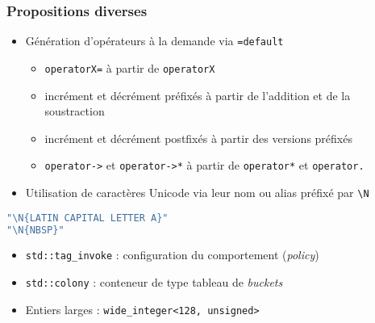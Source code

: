 \documentclass[C++.tex]{subfiles}
\begin{document}
\begin{frame}[fragile]
	\frametitle{Propositions diverses}
	\begin{itemize}
		\item Génération d'opérateurs à la demande via \lstinline|=default|
		\begin{itemize}
			\item \lstinline|operatorX=| à partir de \lstinline|operatorX|
			\item incrément et décrément préfixés à partir de l'addition et de la soustraction
			\item incrément et décrément postfixés à partir des versions préfixés
			\item \lstinline|operator->| et \lstinline|operator->*| à partir de \lstinline|operator*| et \lstinline|operator.|


		\end{itemize}
	
		\item Utilisation de caractères Unicode via leur nom ou alias préfixé par \lstinline|\N|
	\end{itemize}

	\begin{lstlisting}[language=C++]
"\N{LATIN CAPITAL LETTER A}"
"\N{NBSP}"\end{lstlisting}

	\begin{itemize}
		\item \lstinline|std::tag_invoke| : configuration du comportement (\textit{policy})


		\item \lstinline|std::colony| : conteneur de type \og tableau de \textit{buckets}\fg{}
		\item Entiers larges : \lstinline|wide_integer<128, unsigned>|
	\end{itemize}
\end{frame}
\end{document}
